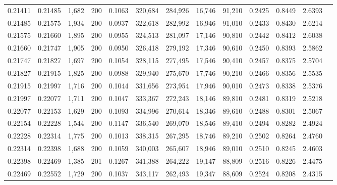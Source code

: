 \begin{tabular}{rrrrrrrrrrrrr}
0.21411 & 0.21485 &  1,682 & 200 &                                     0.1063 & 320,684 & 284,926 &  16,746 &  91,210 & 0.2425 & 0.8449 & 2.6393 \\
0.21485 & 0.21575 &  1,934 & 200 &                                     0.0937 & 322,618 & 282,992 &  16,946 &  91,010 & 0.2433 & 0.8430 & 2.6214 \\
0.21575 & 0.21660 &  1,895 & 200 &                                     0.0955 & 324,513 & 281,097 &  17,146 &  90,810 & 0.2442 & 0.8412 & 2.6038 \\
0.21660 & 0.21747 &  1,905 & 200 &                                     0.0950 & 326,418 & 279,192 &  17,346 &  90,610 & 0.2450 & 0.8393 & 2.5862 \\
0.21747 & 0.21827 &  1,697 & 200 &                                     0.1054 & 328,115 & 277,495 &  17,546 &  90,410 & 0.2457 & 0.8375 & 2.5704 \\
0.21827 & 0.21915 &  1,825 & 200 &                                     0.0988 & 329,940 & 275,670 &  17,746 &  90,210 & 0.2466 & 0.8356 & 2.5535 \\
0.21915 & 0.21997 &  1,716 & 200 &                                     0.1044 & 331,656 & 273,954 &  17,946 &  90,010 & 0.2473 & 0.8338 & 2.5376 \\
0.21997 & 0.22077 &  1,711 & 200 &                                     0.1047 & 333,367 & 272,243 &  18,146 &  89,810 & 0.2481 & 0.8319 & 2.5218 \\
0.22077 & 0.22153 &  1,629 & 200 &                                     0.1093 & 334,996 & 270,614 &  18,346 &  89,610 & 0.2488 & 0.8301 & 2.5067 \\
0.22154 & 0.22228 &  1,544 & 200 &                                     0.1147 & 336,540 & 269,070 &  18,546 &  89,410 & 0.2494 & 0.8282 & 2.4924 \\
0.22228 & 0.22314 &  1,775 & 200 &                                     0.1013 & 338,315 & 267,295 &  18,746 &  89,210 & 0.2502 & 0.8264 & 2.4760 \\
0.22314 & 0.22398 &  1,688 & 200 &                                     0.1059 & 340,003 & 265,607 &  18,946 &  89,010 & 0.2510 & 0.8245 & 2.4603 \\
0.22398 & 0.22469 &  1,385 & 201 &                                     0.1267 & 341,388 & 264,222 &  19,147 &  88,809 & 0.2516 & 0.8226 & 2.4475 \\
0.22469 & 0.22552 &  1,729 & 200 &                                     0.1037 & 343,117 & 262,493 &  19,347 &  88,609 & 0.2524 & 0.8208 & 2.4315 \\

\end{tabular}
